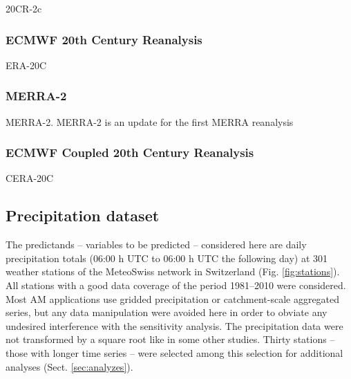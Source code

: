 \documentclass{ametsoc}
\begin{document}
20CR-2c \citep{Compo2011}





\subsubsection{ECMWF 20th Century Reanalysis}

ERA-20C \citep{Poli2016}





\subsubsection{MERRA-2}

MERRA-2. MERRA-2 is an update for the first MERRA reanalysis \citep{Rienecker2011}





\subsubsection{ECMWF Coupled 20th Century Reanalysis}

CERA-20C









\subsection{Precipitation dataset}
\label{sec:precip}

The predictands -- variables to be predicted -- considered here are daily precipitation totals (06:00 h UTC to 06:00 h UTC the following day) at 301 weather stations of the MeteoSwiss network in Switzerland (Fig. \ref{fig:stations}). All stations with a good data coverage of the period 1981--2010 were considered. Most AM applications use gridded precipitation or catchment-scale aggregated series, but any data manipulation were avoided here in order to obviate any undesired interference with the sensitivity analysis. The precipitation data were not transformed by a square root like in some other studies. Thirty stations -- those with longer time series -- were selected among this selection for additional analyses (Sect. \ref{sec:analyzes}).
\end{document}

